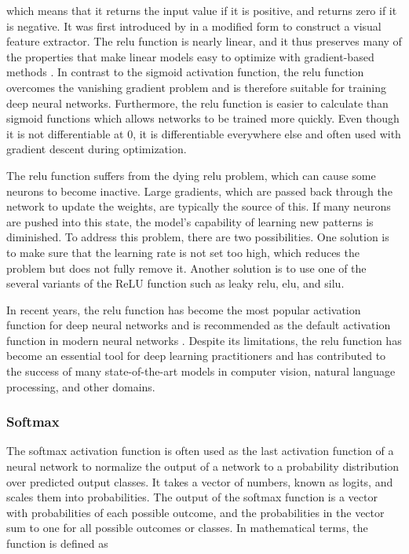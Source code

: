 \documentclass[draft,final]{vutinfth} %
\begin{document}
which means that it returns the input value if it is positive, and
returns zero if it is negative. It was first introduced by
\textcite{fukushima1969} in a modified form to construct a visual
feature extractor. The \gls{relu} function is nearly linear, and it
thus preserves many of the properties that make linear models easy to
optimize with gradient-based methods \cite{goodfellow2016}. In
contrast to the sigmoid activation function, the \gls{relu} function
overcomes the vanishing gradient problem  and is therefore suitable for training deep neural
networks. Furthermore, the \gls{relu} function is easier to calculate
than sigmoid functions which allows networks to be trained more
quickly. Even though it is not differentiable at $0$, it is
differentiable everywhere else and often used with gradient descent
during optimization.

The \gls{relu} function suffers from the dying \gls{relu} problem,
which can cause some neurons to become inactive. Large gradients,
which are passed back through the network to update the weights, are
typically the source of this. If many neurons are pushed into this
state, the model's capability of learning new patterns is
diminished. To address this problem, there are two possibilities. One
solution is to make sure that the learning rate is not set too high,
which reduces the problem but does not fully remove it. Another
solution is to use one of the several variants of the ReLU function
such as leaky \gls{relu}, \gls{elu}, and \gls{silu}.

In recent years, the \gls{relu} function has become the most popular
activation function for deep neural networks and is recommended as the
default activation function in modern neural networks
\cite{goodfellow2016}. Despite its limitations, the \gls{relu}
function has become an essential tool for deep learning practitioners
and has contributed to the success of many state-of-the-art models in
computer vision, natural language processing, and other domains.

\subsubsection{Softmax}
\label{sssec:theory-softmax}

The softmax activation function is often used as the last activation
function of a neural network to normalize the output of a network to a
probability distribution over predicted output classes. It takes a
vector of numbers, known as logits, and scales them into
probabilities. The output of the softmax function is a vector with
probabilities of each possible outcome, and the probabilities in the
vector sum to one for all possible outcomes or classes. In
mathematical terms, the function is defined as
\end{document}
